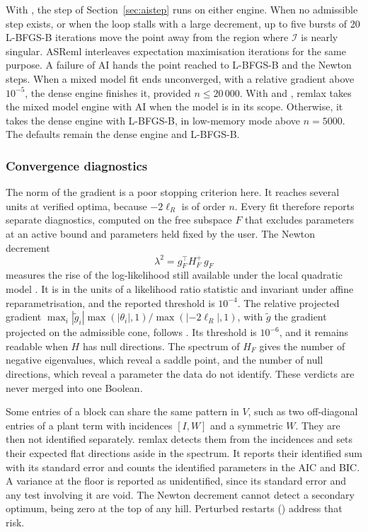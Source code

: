 \documentclass[article,nojss]{jss}
\renewcommand{\pkg}[1]{#1}
\begin{document}
With , the step of Section~\ref{sec:aistep} runs on
either engine. When no admissible step exists, or when the loop stalls with a
large decrement, up to five bursts of 20 L-BFGS-B iterations move the point
away from the region where $\mathcal{I}$ is nearly singular. \pkg{ASReml}
interleaves expectation maximisation iterations for the same purpose. A
failure of AI hands the point reached to L-BFGS-B and the Newton steps. When
a mixed model fit ends unconverged, with a relative gradient above $10^{-5}$,
the dense engine finishes it, provided $n \le 20\,000$. With
 and , \pkg{remlax} takes the
mixed model engine with AI when the model is in its scope. Otherwise, it takes
the dense engine with L-BFGS-B, in low-memory mode above $n = 5000$. The
defaults remain the dense engine and L-BFGS-B.

\subsubsection{Convergence diagnostics}

The norm of the gradient is a poor stopping criterion here. It reaches several
units at verified optima, because $-2\ell_R$ is of order $n$. Every fit
therefore reports separate diagnostics, computed on the free subspace $F$
that excludes parameters at an active bound and parameters held fixed by the
user. The Newton decrement
\begin{equation}\label{eq:decrement}
  \lambda^2 = g_F^\top H_F^{+}\, g_F
\end{equation}
measures the rise of the log-likelihood still available under the local
quadratic model \citep{boyd2004}. It is in the units of a likelihood ratio
statistic and invariant under affine reparametrisation, and the reported
threshold is $10^{-4}$. The relative projected gradient $\max_i |\tilde g_i|
\max(|\theta_i|, 1)/\max(|{-2\ell_R}|, 1)$, with $\tilde g$ the gradient
projected on the admissible cone, follows \citet{dennis1983}. Its threshold is
$10^{-6}$, and it remains readable when $H$ has null directions. The spectrum
of $H_F$ gives the number of negative eigenvalues, which reveal a saddle
point, and the number of null directions, which reveal a parameter the data do
not identify. These verdicts are never merged into one Boolean.

Some entries of a  block can share the same pattern in $V$, such as
two off-diagonal entries of a plant term with incidences $[I, W]$ and a
symmetric $W$. They are then not identified separately. \pkg{remlax} detects
them from the incidences and sets their expected flat directions aside in the
spectrum. It reports their identified sum with its standard error and counts
the identified parameters in the AIC and BIC. A variance at the floor is
reported as unidentified, since its standard error and any test involving it
are void. The Newton decrement cannot detect a secondary optimum, being zero
at the top of any hill. Perturbed restarts () address that
risk.
\end{document}
